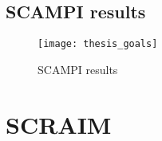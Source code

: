 \subsection{SCAMPI results}
\begin{figure}[h]
	\begin{center}
		\leavevmode
		\texttt{[image: thesis\_goals]}
		\caption{SCAMPI results}
		\label{fig:arch}
	\end{center}
\end{figure}

\section{SCRAIM}
